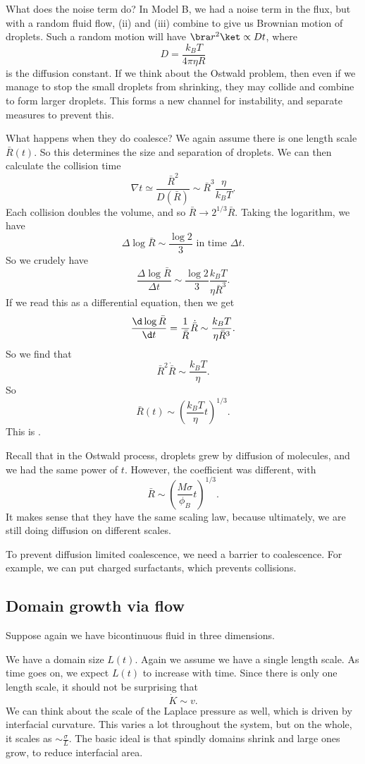 \documentclass[a4paper]{article}
\begin{document}
What does the noise term do? In Model B, we had a noise term in the flux, but with a random fluid flow, (ii) and (iii) combine to give us Brownian motion of droplets. Such a random motion will have $\bra r^2\ket \propto Dt$, where
\[
  D = \frac{k_B T}{4\pi \eta R}
\]
is the diffusion constant. If we think about the Ostwald problem, then even if we manage to stop the small droplets from shrinking, they may collide and combine to form larger droplets. This forms a new channel for instability, and separate measures to prevent this.

What happens when they do coalesce? We again assume there is one length scale $\bar{R}(t)$. So this determines the size and separation of droplets. We can then calculate the collision time
\[
  \nabla t \simeq \frac{\bar{R}^2}{D(\bar{R})} \sim \bar{R}^3 \frac{\eta}{k_B T}.
\]
Each collision doubles the volume, and so $\bar{R} \to 2^{1/3} \bar{R}$. Taking the logarithm, we have
\[
  \Delta \log \bar{R} \sim \frac{\log 2}{3}\text{ in time }\Delta t.
\]
So we crudely have
\[
  \frac{\Delta \log \bar{R}}{\Delta t} \sim \frac{\log 2}{3} \frac{k_B T}{\eta \bar{R}^3}.
\]
If we read this as a differential equation, then we get
\[
  \frac{\d \log \bar{R}}{\d t} = \frac{1}{\bar{R}} \dot{\bar{R}} \sim \frac{k_B T}{\eta \bar{R}^3}.
\]
So we find that
\[
  \bar{R}^2 \dot{\bar{R}} \sim \frac{k_B T}{\eta}.
\]
So
\[
  \bar{R}(t) \sim \left(\frac{k_B T}{\eta} t\right)^{1/3}.
\]
This is .

Recall that in the Ostwald process, droplets grew by diffusion of molecules, and we had the same power of $t$. However, the coefficient was different, with
\[
  \bar{R} \sim \left(\frac{M \sigma}{\phi_B} t\right)^{1/3}.
\]
It makes sense that they have the same scaling law, because ultimately, we are still doing diffusion on different scales.

To prevent diffusion limited coalescence, we need a barrier to coalescence. For example, we can put charged surfactants, which prevents collisions.

\subsection{Domain growth via flow}
Suppose again we have bicontinuous fluid in three dimensions.

We have a domain size $L(t)$. Again we assume we have a single length scale. As time goes on, we expect $L(t)$ to increase with time. Since there is only one length scale, it should not be surprising that
\[
  \dot{K} \sim v.
\]
We can think about the scale of the Laplace pressure as well, which is driven by interfacial curvature. This varies a lot throughout the system, but on the whole, it scales as $\sim \frac{\sigma}{L}$. The basic ideal is that spindly domains shrink and large ones grow, to reduce interfacial area.
\end{document}
